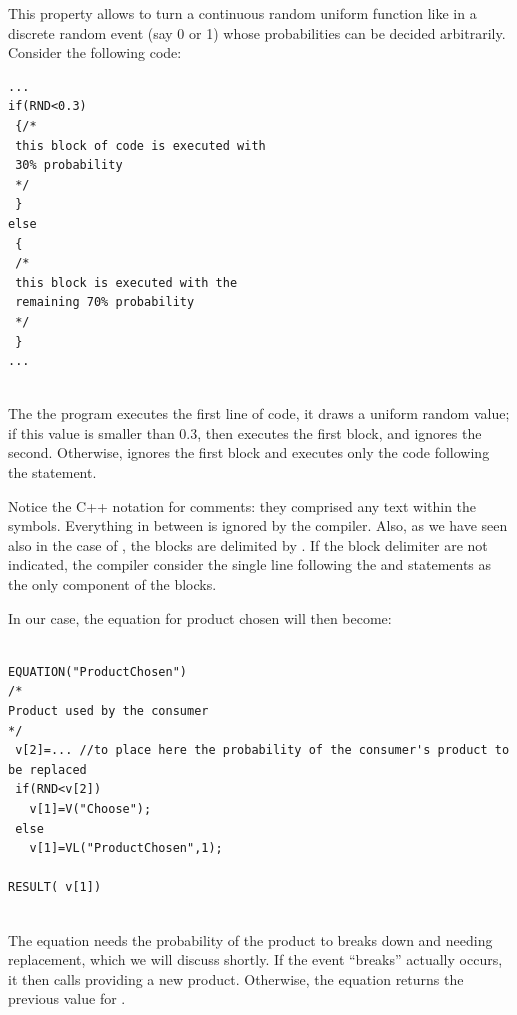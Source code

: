\documentclass [11pt,a4paper] {book}
\begin{document}
This property allows to turn a continuous random uniform function like  in a discrete random event (say 0 or 1) whose probabilities can be decided arbitrarily. Consider the following code:

\begin{minipage}[h]{10cm}
\small
\begin{verbatim}
...
if(RND<0.3)
 {/*
 this block of code is executed with 
 30% probability
 */
 }
else
 {
 /*
 this block is executed with the 
 remaining 70% probability
 */ 
 } 
...
 
\end{verbatim}
\normalsize
\end{minipage}

The the program executes the first line of code, it draws a uniform random value; if this value is smaller than 0.3, then executes the first block, and ignores the second. Otherwise, ignores the first block and executes only the code following the  statement.

Notice the C++ notation for comments: they comprised any text within the  symbols. Everything in between is ignored by the compiler. Also, as we have seen also in the case of , the blocks are delimited by \code{ \{ \}}. If the block delimiter are not indicated, the compiler consider the single line following  the  and  statements as the only component of the blocks.

In our case, the equation for product chosen will then become:


\begin{minipage}[h]{10cm}
\small
\begin{verbatim}

EQUATION("ProductChosen")
/*
Product used by the consumer
*/
 v[2]=... //to place here the probability of the consumer's product to be replaced
 if(RND<v[2])
   v[1]=V("Choose");
 else
   v[1]=VL("ProductChosen",1);

RESULT( v[1])
 
\end{verbatim}
\normalsize
\end{minipage}

The equation needs the probability of the product to breaks down and needing replacement, which we will discuss shortly. If the event ``breaks'' actually occurs, it then calls  providing a new product. Otherwise, the equation returns the previous value for . 
\end{document}
